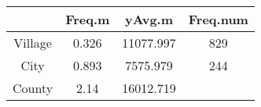 \documentclass[]{book}
\theoremstyle{definition}
\theoremstyle{definition}
\theoremstyle{definition}
\theoremstyle{remark}
\begin{document}
\begin{longtable}[]{@{}cccc@{}}
\toprule
\begin{minipage}[b]{0.12\columnwidth}\centering\strut
~\strut
\end{minipage} & \begin{minipage}[b]{0.11\columnwidth}\centering\strut
Freq.m\strut
\end{minipage} & \begin{minipage}[b]{0.15\columnwidth}\centering\strut
yAvg.m\strut
\end{minipage} & \begin{minipage}[b]{0.15\columnwidth}\centering\strut
Freq.num\strut
\end{minipage}\tabularnewline
\midrule
\endhead
\begin{minipage}[t]{0.12\columnwidth}\centering\strut
Village\strut
\end{minipage} & \begin{minipage}[t]{0.11\columnwidth}\centering\strut
0.326\strut
\end{minipage} & \begin{minipage}[t]{0.15\columnwidth}\centering\strut
11077.997\strut
\end{minipage} & \begin{minipage}[t]{0.15\columnwidth}\centering\strut
829\strut
\end{minipage}\tabularnewline
\begin{minipage}[t]{0.12\columnwidth}\centering\strut
City\strut
\end{minipage} & \begin{minipage}[t]{0.11\columnwidth}\centering\strut
0.893\strut
\end{minipage} & \begin{minipage}[t]{0.15\columnwidth}\centering\strut
7575.979\strut
\end{minipage} & \begin{minipage}[t]{0.15\columnwidth}\centering\strut
244\strut
\end{minipage}\tabularnewline
\begin{minipage}[t]{0.12\columnwidth}\centering\strut
County\strut
\end{minipage} & \begin{minipage}[t]{0.11\columnwidth}\centering\strut
2.14\strut
\end{minipage} & \begin{minipage}[t]{0.15\columnwidth}\centering\strut
16012.719\strut
\end{minipage} & \begin{minipage}[t]{0.15\columnwidth}\centering\strut

\end{minipage}
\end{longtable}
\end{document}
